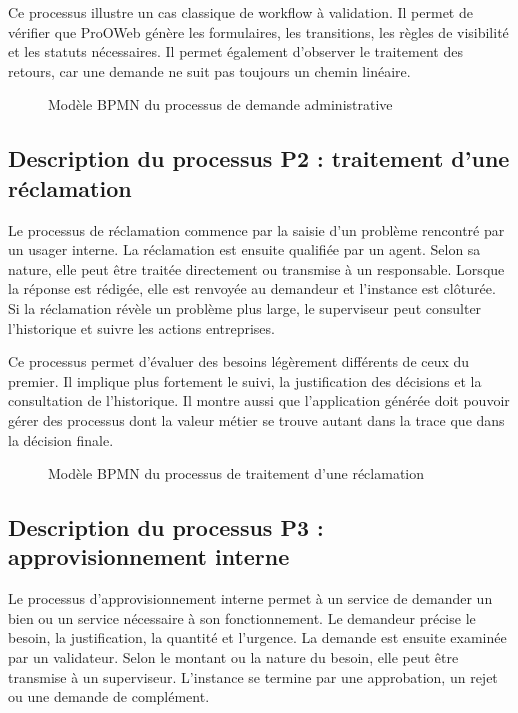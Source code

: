 Ce processus illustre un cas classique de workflow à validation. Il permet de vérifier que ProOWeb génère les formulaires, les transitions, les règles de visibilité et les statuts nécessaires. Il permet également d'observer le traitement des retours, car une demande ne suit pas toujours un chemin linéaire.

\begin{figure}[H]
\centering
{}
\caption{Modèle BPMN du processus de demande administrative}
\label{fig:chap4-bpmn-demande-administrative}
\end{figure}

\subsection{Description du processus P2 : traitement d'une réclamation}

Le processus de réclamation commence par la saisie d'un problème rencontré par un usager interne. La réclamation est ensuite qualifiée par un agent. Selon sa nature, elle peut être traitée directement ou transmise à un responsable. Lorsque la réponse est rédigée, elle est renvoyée au demandeur et l'instance est clôturée. Si la réclamation révèle un problème plus large, le superviseur peut consulter l'historique et suivre les actions entreprises.

Ce processus permet d'évaluer des besoins légèrement différents de ceux du premier. Il implique plus fortement le suivi, la justification des décisions et la consultation de l'historique. Il montre aussi que l'application générée doit pouvoir gérer des processus dont la valeur métier se trouve autant dans la trace que dans la décision finale.

\begin{figure}[H]
\centering
{}
\caption{Modèle BPMN du processus de traitement d'une réclamation}
\label{fig:chap4-bpmn-reclamation}
\end{figure}

\subsection{Description du processus P3 : approvisionnement interne}

Le processus d'approvisionnement interne permet à un service de demander un bien ou un service nécessaire à son fonctionnement. Le demandeur précise le besoin, la justification, la quantité et l'urgence. La demande est ensuite examinée par un validateur. Selon le montant ou la nature du besoin, elle peut être transmise à un superviseur. L'instance se termine par une approbation, un rejet ou une demande de complément.

